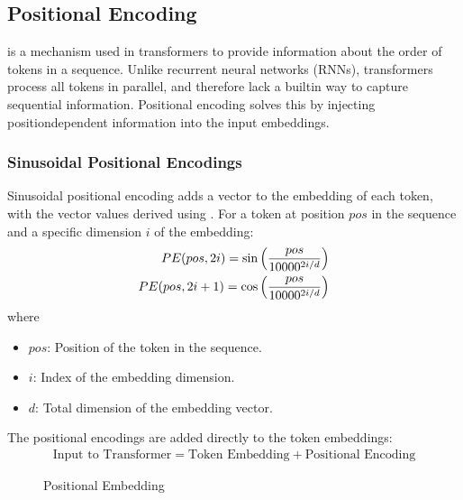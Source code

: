 \documentclass[letterpaper,11pt,english]{sphinxmanual}
\begin{document}
\subsection{Positional Encoding}
\label{\detokenize{pretraining:positional-encoding}}
\sphinxAtStartPar
{} is a mechanism used in transformers to provide
information about the order of tokens in a sequence. Unlike recurrent
neural networks (RNNs), transformers process all tokens in parallel, and
therefore lack a built\sphinxhyphen{}in way to capture sequential information.
Positional encoding solves this by injecting position\sphinxhyphen{}dependent
information into the input embeddings.


\subsubsection{Sinusoidal Positional Encodings}
\label{\detokenize{pretraining:sinusoidal-positional-encodings}}
\sphinxAtStartPar
Sinusoidal positional encoding adds a vector to the embedding of each
token, with the vector values derived using .
For a token at position \(pos\) in the sequence and a specific
dimension \(i\) of the embedding:
\begin{equation*}
\begin{split}PE(pos,2i) = \sin\Big({pos\over 10000^{2i/d}}\Big)\\
PE(pos,2i+1) = \cos\Big({pos\over 10000^{2i/d}}\Big)\end{split}
\end{equation*}
\sphinxAtStartPar
where
\begin{itemize}
\item {} 
\sphinxAtStartPar
\(pos\): Position of the token in the sequence.

\item {} 
\sphinxAtStartPar
\(i\): Index of the embedding dimension.

\item {} 
\sphinxAtStartPar
\(d\): Total dimension of the embedding vector.

\end{itemize}

\sphinxAtStartPar
The positional encodings are added directly to the token embeddings:
\begin{equation*}
\begin{split}\text{Input to Transformer} = \text{Token Embedding} + \text{Positional Encoding}\end{split}
\end{equation*}
\begin{figure}[htbp]
\centering
\capstart

\noindent{}
\caption{Positional Embedding}\label{\detokenize{pretraining:id11}}\end{figure}
\end{document}
